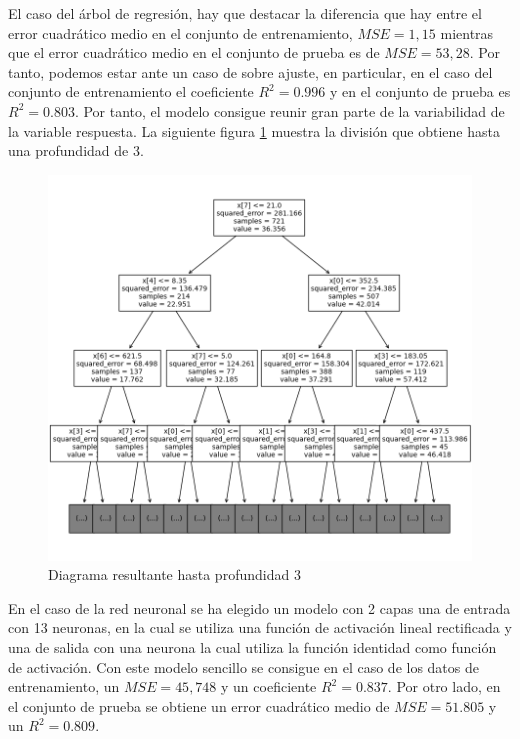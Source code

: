 \noindent El caso del árbol de regresión, hay que destacar la diferencia que hay entre el error cuadrático medio en el conjunto de entrenamiento, $MSE=1,15$ mientras que el error cuadrático medio en el conjunto de prueba es de $MSE=53,28$. Por tanto, podemos estar ante un caso de sobre ajuste, en particular, en el caso del conjunto de entrenamiento el coeficiente $R^2=0.996$ y en el conjunto de prueba es $R^2=0.803$.  Por tanto, el modelo consigue reunir gran parte de la variabilidad de la variable respuesta. La siguiente figura \ref{fig:diagrama arbol} muestra la división que obtiene hasta una profundidad de 3.

\begin{figure}[h]
  \centering
  \includegraphics[scale=0.32]{Documentos Extra/Imagenes/Arbol.png}
  \caption{Diagrama resultante hasta profundidad 3}
  \label{fig:diagrama arbol}
\end{figure}
  

\noindent En el caso de la red neuronal se ha elegido un modelo con 2 capas una de entrada con 13 neuronas, en la cual se utiliza una función de activación lineal rectificada y una de salida con una neurona la cual utiliza la función identidad como función de activación. Con este modelo sencillo se consigue en el caso de los datos de entrenamiento, un $MSE=45,748$ y un coeficiente $R^2=0.837$. Por otro lado, en el conjunto de prueba se obtiene un error cuadrático medio de $MSE=51.805$ y un $R^2=0.809$.

